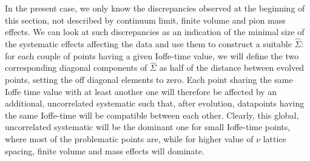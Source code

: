 %
In the present case, we only know the discrepancies observed at the beginning of this section,
not described by continuum limit, finite volume and pion mass effects.
We can look at such discrepancies as an indication of the minimal size of the systematic
effects affecting the data and use them to construct a suitable $\hat{\Sigma}$:
for each couple of points having a given Ioffe-time value, we will define the two corresponding diagonal components
of $\hat{\Sigma}$ as half of the distance between evolved points, setting the off diagonal elements to zero.
Each point sharing the same Ioffe time value with at least another one will therefore be affected by an additional, 
uncorrelated systematic such that, after evolution, datapoints having the same Ioffe-time will be compatible between each other. 
Clearly, this global, uncorrelated systematic will be the dominant one for small Ioffe-time points, 
where most of the problematic points are, while for higher value of $\nu$ lattice spacing, finite volume
and mass effects will dominate.



